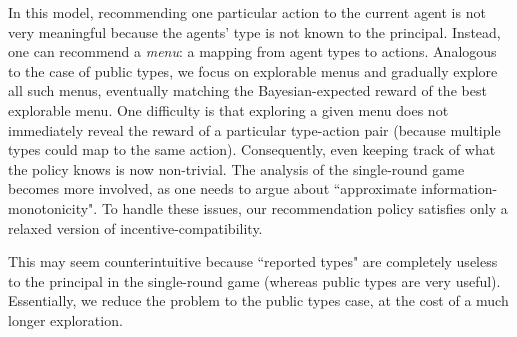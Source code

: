  In this model, recommending one particular action to the current agent is not very meaningful because the agents' type is not known to the principal. Instead, one can recommend a \emph{menu}: a mapping from agent types to actions. Analogous to the case of public types, we focus on explorable menus and gradually explore all such menus, eventually matching the Bayesian-expected reward of the best explorable menu.
%
%
One difficulty is that exploring a given menu does not immediately reveal the reward of a particular type-action pair (because multiple types could map to the same action). Consequently, even keeping track of what the policy knows is now non-trivial. The analysis of the single-round game becomes more involved, as one needs to argue about ``approximate information-monotonicity". To handle these issues, our recommendation policy satisfies only a relaxed version of incentive-compatibility.

 This may seem counterintuitive because ``reported types" are completely useless to the principal in the single-round game (whereas public types are very useful). Essentially, we reduce the problem to the public types case, at the cost of a much longer exploration.
